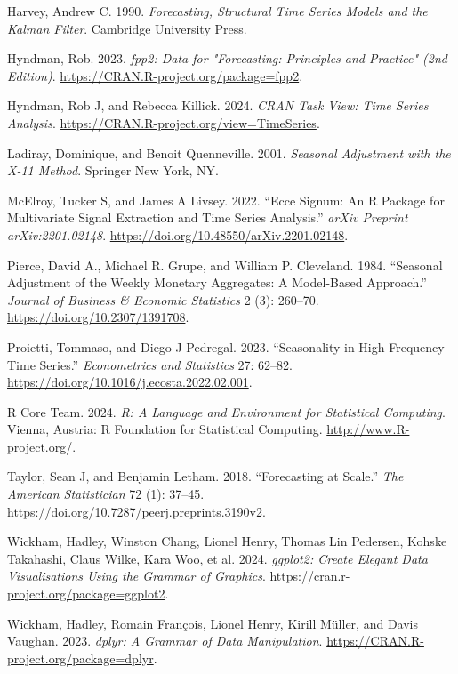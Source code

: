 \begin{CSLReferences}{1}{0}
\leavevmode{}%
Harvey, Andrew C. 1990. \emph{Forecasting, Structural Time Series Models and the {K}alman Filter}. Cambridge University Press.

\leavevmode{}%
Hyndman, Rob. 2023. \emph{{fpp2}: {D}ata for "{F}orecasting: {P}rinciples and {P}ractice" (2nd {E}dition)}. \url{https://CRAN.R-project.org/package=fpp2}.

\leavevmode{}%
Hyndman, Rob J, and Rebecca Killick. 2024. \emph{{C}RAN {T}ask {V}iew: {T}ime {S}eries {A}nalysis}. \url{https://CRAN.R-project.org/view=TimeSeries}.

\leavevmode{}%
Ladiray, Dominique, and Benoit Quenneville. 2001. \emph{Seasonal Adjustment with the {X}-11 Method}. Springer New York, NY.

\leavevmode{}%
McElroy, Tucker S, and James A Livsey. 2022. {``{Ecce Signum}: {An} {R} {P}ackage for Multivariate Signal Extraction and Time Series Analysis.''} \emph{arXiv Preprint arXiv:2201.02148}. \url{https://doi.org/10.48550/arXiv.2201.02148}.

\leavevmode{}%
Pierce, David A., Michael R. Grupe, and William P. Cleveland. 1984. {``Seasonal Adjustment of the Weekly Monetary Aggregates: A Model-Based Approach.''} \emph{Journal of Business \& Economic Statistics} 2 (3): 260--70. \url{https://doi.org/10.2307/1391708}.

\leavevmode{}%
Proietti, Tommaso, and Diego J Pedregal. 2023. {``Seasonality in {H}igh {F}requency {T}ime {S}eries.''} \emph{Econometrics and Statistics} 27: 62--82. \url{https://doi.org/10.1016/j.ecosta.2022.02.001}.

\leavevmode{}%
R Core Team. 2024. \emph{R: A Language and Environment for Statistical Computing}. Vienna, Austria: R Foundation for Statistical Computing. \url{http://www.R-project.org/}.

\leavevmode{}%
Taylor, Sean J, and Benjamin Letham. 2018. {``Forecasting at Scale.''} \emph{The American Statistician} 72 (1): 37--45. \url{https://doi.org/10.7287/peerj.preprints.3190v2}.

\leavevmode{}%
Wickham, Hadley, Winston Chang, Lionel Henry, Thomas Lin Pedersen, Kohske Takahashi, Claus Wilke, Kara Woo, et al. 2024. \emph{{ggplot2}: Create Elegant Data Visualisations Using the Grammar of Graphics}. \url{https://cran.r-project.org/package=ggplot2}.

\leavevmode{}%
Wickham, Hadley, Romain François, Lionel Henry, Kirill Müller, and Davis Vaughan. 2023. \emph{{dplyr}: A Grammar of Data Manipulation}. \url{https://CRAN.R-project.org/package=dplyr}.

\end{CSLReferences}


